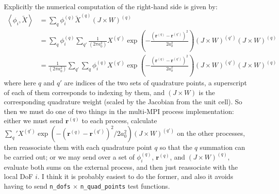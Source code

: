 \documentclass[reqno]{article}
\begin{document}
Explicitly the numerical computation of the right-hand side is given by:
\begin{equation}
    \begin{split}
        \left< \phi_i, \tilde{X}\right>
        &=
        \sum_q \phi_i^{(q)} \tilde{X}^{(q)} \left( J \times W \right)^{(q)} \\
        &=
        \sum_q \phi_i^{(q)} 
            \sum_{q'} \frac{1}{\left( 2 \pi a_0^2 \right)} X^{(q')} \exp \left( - \frac{(\mathbf{r}^{(q)} - \mathbf{r}^{(q')})^2}{2 a_0^2} \right) 
            \left( J \times W \right)^{(q')} 
        \left( J \times W \right)^{(q)}\\
        &= 
        \frac{1}{\left( 2 \pi a_0^2 \right)} 
        \sum_{q'} \sum_q \phi_i^{(q)}
            X^{(q')} \exp \left( - \frac{(\mathbf{r}^{(q)} - \mathbf{r}^{(q')})^2}{2 a_0^2} \right) 
            \left( J \times W \right)^{(q')}
        \left( J \times W \right)^{(q)}
        \end{split}
\end{equation}
where here $q$ and $q'$ are indices of the two sets of quadrature points, a superscript of each of them corresponds to indexing by them, and $(J \times W)$ is the corresponding quadrature weight (scaled by the Jacobian from the unit cell).
So then we must do one of two things in the multi-MPI process implementation: either we must send $\mathbf{r}^{(q)}$ to each process, calculate $\sum_q' X^{(q')} \exp\left( -(\mathbf{r}^{(q)} - \mathbf{r}^{(q')})^2 / 2 a_0^2 \right) (J \times W)^{(q')}$ on the other processes, then reassociate them with each quadrature point $q$ so that the $q$ summation can be carried out; or we may send over a set of $\phi_i^{(q)}$, $\mathbf{r}^{(q)}$, and $(J \times W)^{(q)}$, evaluate both sums on the external process, and then just reassociate with the local DoF $i$.
I think it is probably easiest to do the former, and also it avoids having to send \verb|n_dofs| $\times$ \verb|n_quad_points| test functions.
\end{document}
